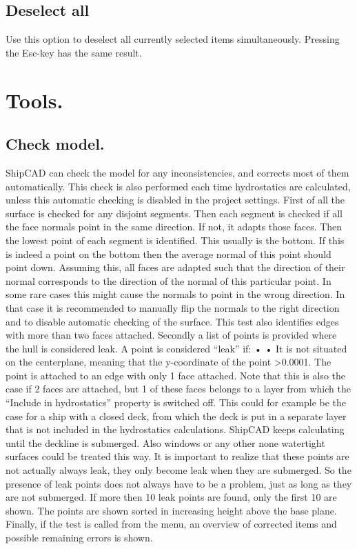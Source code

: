 \documentclass[12pt]{article}
\begin{document}
\subsection{Deselect all}
Use this option to deselect all currently selected items simultaneously. Pressing the Esc-key has
the same result.

\section{Tools.}

\subsection{Check model.} \label{check-model}
ShipCAD can check the model for any inconsistencies, and corrects most of them automatically.
This check is also performed each time hydrostatics are calculated, unless this automatic checking
is disabled in the project settings. First of all the surface is checked for any disjoint segments. Then
each segment is checked if all the face normals point in the same direction. If not, it adapts those
faces. Then the lowest point of each segment is identified. This usually is the bottom. If this is
indeed a point on the bottom then the average normal of this point should point down. Assuming
this, all faces are adapted such that the direction of their normal corresponds to the direction of the
normal of this particular point. In some rare cases this might cause the normals to point in the wrong
direction. In that case it is recommended to manually flip the normals to the right direction and to
disable automatic checking of the surface. This test also identifies edges with more than two faces
attached. Secondly a list of points is provided where the hull is considered leak. A point is
considered “leak” if:
•
•
It is not situated on the centerplane, meaning that the y-coordinate of the point >0.0001.
The point is attached to an edge with only 1 face attached. Note that this is also the case if
2 faces are attached, but 1 of these faces belongs to a layer from which the “Include in
hydrostatics” property is switched off. This could for example be the case for a ship with a
closed deck, from which the deck is put in a separate layer that is not included in the
hydrostatics calculations. ShipCAD keeps calculating until the deckline is submerged.
Also windows or any other none watertight surfaces could be treated this way.
It is important to realize that these points are not actually always leak, they only become leak when
they are submerged. So the presence of leak points does not always have to be a problem, just as
long as they are not submerged. If more then 10 leak points are found, only the first 10 are shown.
The points are shown sorted in increasing height above the base plane.
Finally, if the test is called from the menu, an overview of corrected items and possible remaining
errors is shown.
\end{document}
